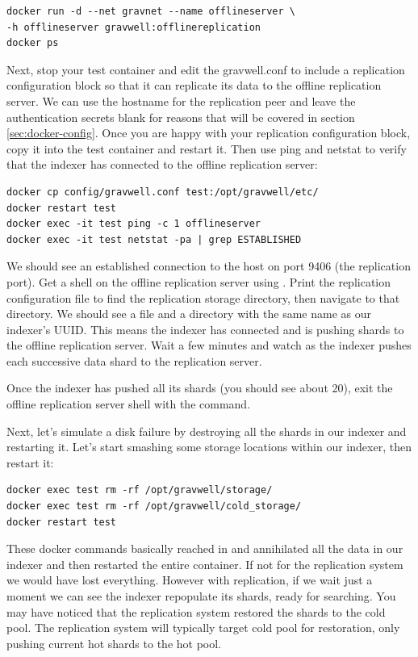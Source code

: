 {\begin{Verbatim}[breaklines=true]
docker run -d --net gravnet --name offlineserver \
-h offlineserver gravwell:offlinereplication
docker ps
\end{Verbatim}

Next, stop your test container and edit the gravwell.conf to include a
replication configuration block so that it can replicate its data to the
offline replication server. We can use the hostname
 for the replication peer and leave the authentication
secrets blank for reasons that will be covered in section \ref{sec:docker-config}. Once you
are happy with your replication configuration block, copy it into the
test container and restart it. Then use ping and netstat to verify that the indexer has connected to the offline replication server:

\begin{Verbatim}[breaklines=true]
docker cp config/gravwell.conf test:/opt/gravwell/etc/
docker restart test
docker exec -it test ping -c 1 offlineserver
docker exec -it test netstat -pa | grep ESTABLISHED
\end{Verbatim}

We should see an established connection to the host
 on port 9406 (the replication port). Get a shell
on the offline replication server using \code{docker exec -it offlineserver
/bin/sh}. Print the replication configuration file to find the
replication storage directory, then navigate to that directory. We
should see a \code{replication.db} file and a directory with the same name
as our indexer's UUID. This means the indexer has connected and is
pushing shards to the offline replication server. Wait a few minutes
and watch as the indexer pushes each successive data shard to the
replication server.

Once the indexer has pushed all its shards (you should see about 20),
exit the offline replication server shell with the \code{exit} command.

Next, let's simulate a disk failure by destroying all the shards in our
indexer and restarting it. Let's start smashing some storage locations
within our indexer, then restart it:

\begin{Verbatim}[breaklines=true]
docker exec test rm -rf /opt/gravwell/storage/
docker exec test rm -rf /opt/gravwell/cold_storage/
docker restart test
\end{Verbatim}

These docker commands basically reached in and annihilated all the data
in our indexer and then restarted the entire container. If not for the
replication system we would have lost everything. However with
replication, if we wait just a moment we can see the indexer repopulate
its shards, ready for searching. You may have noticed that the
replication system restored the shards to the cold pool. The
replication system will typically target cold pool for restoration, only
pushing current hot shards to the hot pool.

}
